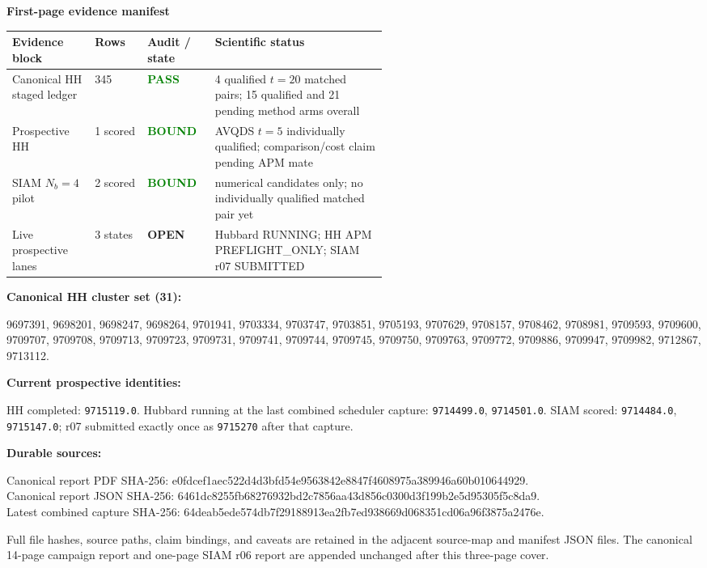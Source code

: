 \documentclass[9pt,letterpaper,landscape]{article}
\newcommand{\good}[1]{\textcolor{green}{\textbf{#1}}}
\newcommand{\pending}[1]{\textcolor{amber}{\textbf{#1}}}
\begin{document}
\begin{minipage}[t]{0.50\linewidth}
{\large\bfseries\color{navy}First-page evidence manifest}

\begin{tabularx}{\linewidth}{@{}p{0.22\linewidth}C{0.14\linewidth}C{0.18\linewidth}Y@{}}
\toprule
Evidence block & Rows & Audit / state & Scientific status \\
\midrule
Canonical HH staged ledger & 345 & \good{PASS} & 4 qualified \(t=20\) matched pairs; 15 qualified and 21 pending method arms overall \\
Prospective HH & 1 scored & \good{BOUND} & AVQDS \(t=5\) individually qualified; comparison/cost claim pending APM mate \\
SIAM \(N_b=4\) pilot & 2 scored & \good{BOUND} & numerical candidates only; no individually qualified matched pair yet \\
Live prospective lanes & 3 states & \pending{OPEN} & Hubbard RUNNING; HH APM PREFLIGHT\_ONLY; SIAM r07 SUBMITTED \\
\bottomrule
\end{tabularx}

\vspace{5pt}
{\bfseries Canonical HH cluster set (31):}\par
{\ttfamily\tiny
9697391, 9698201, 9698247, 9698264, 9701941, 9703334, 9703747, 9703851, 9705193, 9707629, 9708157, 9708462, 9708981, 9709593, 9709600, 9709707, 9709708, 9709713, 9709723, 9709731, 9709741, 9709744, 9709745, 9709750, 9709763, 9709772, 9709886, 9709947, 9709982, 9712867, 9713112.}

\vspace{4pt}
{\bfseries Current prospective identities:}\par
HH completed: \texttt{9715119.0}. Hubbard running at the last combined scheduler capture: \texttt{9714499.0}, \texttt{9714501.0}. SIAM scored: \texttt{9714484.0}, \texttt{9715147.0}; r07 submitted exactly once as \texttt{9715270} after that capture.

\vspace{4pt}
{\bfseries Durable sources:}\par
Canonical report PDF SHA-256: {\ttfamily\tiny e0fdcef1aec522d4d3bfd54e9563842e8847f4608975a389946a60b010644929}.\\
Canonical report JSON SHA-256: {\ttfamily\tiny 6461dc8255fb68276932bd2c7856aa43d856c0300d3f199b2e5d95305f5c8da9}.\\
Latest combined capture SHA-256: {\ttfamily\tiny 64deab5ede574db7f29188913ea2fb7ed938669d068351cd06a96f3875a2476e}.

\vspace{4pt}
Full file hashes, source paths, claim bindings, and caveats are retained in the adjacent source-map and manifest JSON files. The canonical 14-page campaign report and one-page SIAM r06 report are appended unchanged after this three-page cover.
\end{minipage}
\end{document}
